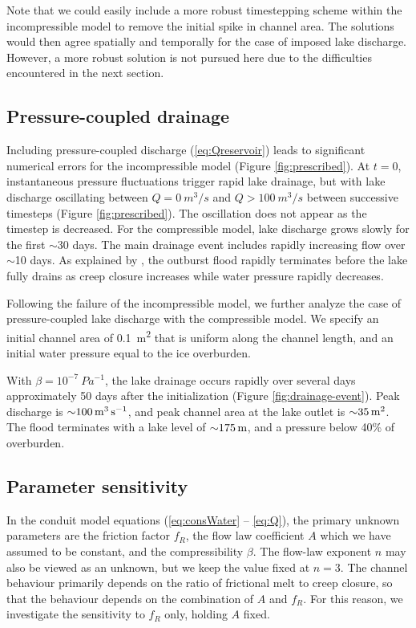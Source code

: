 \documentclass[11pt]{article}
\begin{document}
Note that we could easily include a more robust timestepping scheme within the incompressible model to remove the initial spike in channel area. The solutions would then agree spatially and temporally for the case of imposed lake discharge. However, a more robust solution is not pursued here due to the difficulties encountered in the next section.

\subsection{Pressure-coupled drainage}
Including pressure-coupled discharge (\ref{eq:Qreservoir}) leads to significant numerical errors for the incompressible model (Figure \ref{fig:prescribed}). At $t = 0$, instantaneous pressure fluctuations trigger rapid lake drainage, but with lake discharge oscillating between $Q = \SI{0}{m^3/s}$ and $Q > \SI{100}{m^3/s}$ between successive timesteps (Figure \ref{fig:prescribed}). The oscillation does not appear as the timestep is decreased. For the compressible model, lake discharge grows slowly for the first $\sim$30 days. The main drainage event includes rapidly increasing flow over $\sim$10 days. As explained by \citet{nye1976}, the outburst flood rapidly terminates before  the lake fully drains as creep closure increases while water pressure rapidly decreases.

Following the failure of the incompressible model, we further analyze the case of pressure-coupled lake discharge with the compressible model. We specify an initial channel area of \SI{0.1}{m^2} that is uniform along the channel length, and an initial water pressure equal to the ice overburden. 

With $\beta = 10^{-7}\SI{}{Pa^{-1}}$, the lake drainage occurs rapidly over several days approximately 50 days after the initialization (Figure \ref{fig:drainage-event}). Peak discharge is $\SI{\sim100}{m^3.s^{-1}}$, and peak channel area at the lake outlet is $\SI{\sim35}{m^2}$. The flood terminates with a lake level of $\SI{\sim 175}{m}$, and a pressure below 40\% of overburden.

\subsection{Parameter sensitivity}
In the conduit model equations (\ref{eq:consWater} -- \ref{eq:Q}), the primary unknown parameters are the friction factor $f_R$, the flow law coefficient $A$ which we have assumed to be constant, and the compressibility $\beta$. The flow-law exponent $n$ may also be viewed as an unknown, but we keep the value fixed at $n = 3$. The channel behaviour primarily depends on the ratio of frictional melt to creep closure, so that the behaviour depends on the combination of $A$ and $f_R$. For this reason, we investigate the sensitivity to $f_R$ only, holding $A$ fixed.
\end{document}

